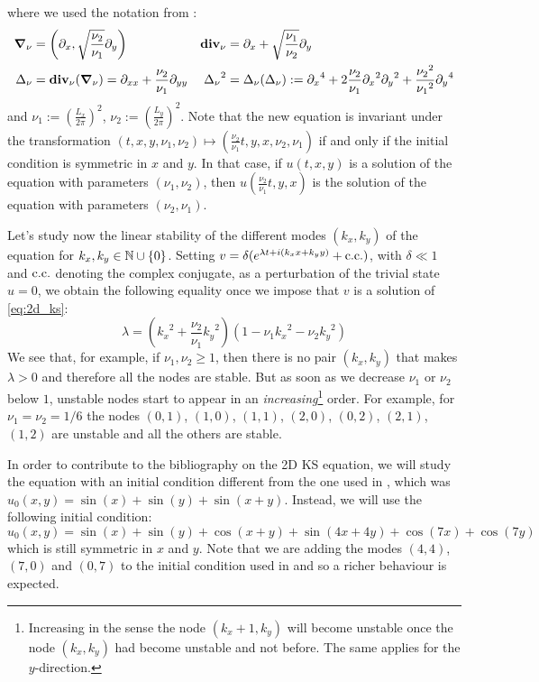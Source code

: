 \documentclass[twoside]{article}
\begin{document}
where we used the notation from \cite{Kalogirou2015}:
\begin{align}
  \grad_\nu & = \left(\partial_x , \sqrt{\frac{\nu_2}{\nu_1}} \partial_y
  \right)   & \operatorname{\boldsymbol{\mathrm{div}}}_\nu                                                   & = \partial_x + \sqrt{\frac{\nu_1}{\nu_2}} \partial_y
  \\ \Delta_\nu &= \operatorname{\boldsymbol{\mathrm{div}}}_\nu(\grad_\nu) = \partial_{xx} + \frac{\nu_2}{\nu_1} \partial_{yy} & {\Delta_\nu}^2 &= \Delta_\nu(\Delta_\nu) := {\partial_{x}}^4 + 2 \frac{\nu_2}{\nu_1} {\partial_{x}}^2{\partial_{y}}^2 + \frac{{\nu_2}^2}{{\nu_1}^2} {\partial_{y}}^4
\end{align}
and $\nu_1 :={\left( \frac{L_x}{2\pi} \right)}^2$, $\nu_2 := {\left( \frac{L_y}{2\pi} \right)}^2$. Note that the new equation is invariant under the transformation $(t,x,y, \nu_1, \nu_2) \mapsto \left( \frac{\nu_2}{\nu_1} t, y, x, \nu_2, \nu_1 \right)$ if and only if the initial condition is symmetric in $x$ and $y$. In that case, if $u(t,x,y)$ is a solution of the equation with parameters $(\nu_1, \nu_2)$, then $u\left( \frac{\nu_2}{\nu_1} t, y, x \right)$ is the solution of the equation with parameters $(\nu_2, \nu_1)$.

Let's study now the linear stability of the different modes $(k_x, k_y)$ of the equation for $k_x,k_y\in\mathbb{N}\cup\{0\}$. Setting $v = \delta(e^{\lambda t+i(k_x x + k_y y)} + \mathrm{c.c.})$, with $\delta \ll 1$ and $\mathrm{c.c.}$ denoting the complex conjugate, as a perturbation of the trivial state $u = 0$, we obtain the following equality once we impose that $v$ is a solution of \cref{eq:2d_ks}:
\begin{equation}\label{eq:linear_stability}
  \lambda = \left({k_x}^2+ \frac{\nu_2}{\nu_1} {k_y}^2\right)\left( 1 - \nu_1{k_x}^2 - \nu_2{k_y}^2\right)
\end{equation}
We see that, for example, if $\nu_1, \nu_2 \geq 1$, then there is no pair $(k_x, k_y)$ that makes $\lambda > 0$ and therefore all the nodes are stable. But as soon as we decrease $\nu_1$ or $\nu_2$ below $1$, unstable nodes start to appear in an \emph{increasing}\footnote{Increasing in the sense the node $(k_x+1,k_y)$ will become unstable once the node $(k_x,k_y)$ had become unstable and not before. The same applies for the $y$-direction.} order. For example, for $\nu_1=\nu_2=1/6$ the nodes $(0,1)$, $(1,0)$, $(1,1)$, $(2,0)$, $(0,2)$, $(2,1)$, $(1,2)$ are unstable and all the others are stable.

In order to contribute to the bibliography on the 2D KS equation, we will study the equation with an initial condition different from the one used in \cite{Kalogirou2015}, which was $u_0(x,y) = \sin(x) + \sin(y) + \sin(x+y)$. Instead, we will use the following initial condition:
\begin{equation}\label{eq:initial_condition}
  u_0(x,y) = \sin(x) + \sin(y) + \cos(x+y) + \sin(4x+4y) + \cos(7x) + \cos(7y)
\end{equation}
which is still symmetric in $x$ and $y$. Note that we are adding the modes $(4,4)$, $(7,0)$ and $(0,7)$ to the initial condition used in \cite{Kalogirou2015} and so a richer behaviour is expected.
\end{document}
